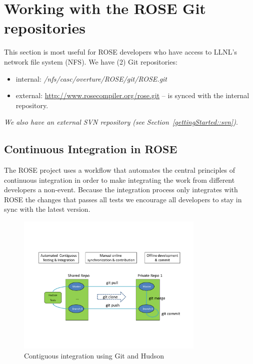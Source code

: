 	\section{Working with the ROSE Git repositories}

%
This section is most useful for ROSE developers who have access to LLNL's network file
system (NFS).
\newline\newline
We have (2) Git repositories:
\begin{itemize}
	\item internal: \textit{/nfs/casc/overture/ROSE/git/ROSE.git}
	\item external: \url{http://www.rosecompiler.org/rose.git} -- is synced with the internal repository.
\end{itemize}

\textit{We also have an external SVN repository (see Section~\ref{gettingStarted::svn})}.
	\subsection{Continuous Integration in ROSE}
The ROSE project uses a workflow that automates the central principles of
continuous integration in order to make integrating the work from different
developers a non-event. Because the integration process only integrates
with ROSE the changes that passes all tests we encourage all developers
to stay in sync with the latest version.

\begin{figure}[htbp]  
  \centering
    \includegraphics[width=0.8\textwidth]{rose-git-hudson.pdf}
  \caption{Contiguous integration using Git and Hudson}
  \label{fig:rose-git-hudson}
\end{figure}

